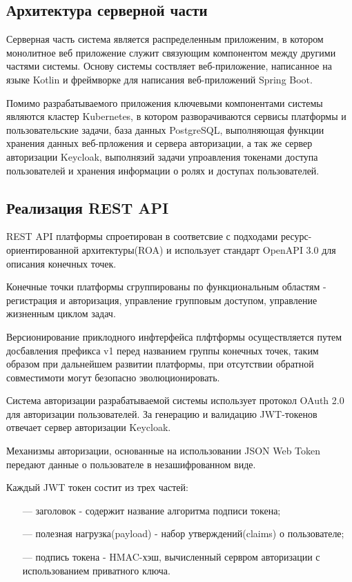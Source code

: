 \subsection{Архитектура серверной части}

Серверная часть система является распределенным приложеним, в котором монолитное веб приложение служит связующим компонентом между другими частями системы.
Основу системы соствляет веб-приложение, написанное на языке Kotlin и фреймворке для написания веб-приложений Spring Boot.

Помимо разрабатываемого приложения ключевыми компонентами системы являются кластер Kubernetes, в котором разворачиваются сервисы платформы и пользовательские задачи, база данных PostgreSQL, выполняющая функции хранения данных веб-прложения и сервера авторизации, а так же сервер авторизации Keycloak, выполнязий задачи упроавления токенами доступа пользователей и хранения информации о ролях и доступах пользователей.

\subsection{Реализация REST API}

REST API платформы спроетирован в соответсвие с подходами ресурс-ориентированной архитектуры(ROA)\cite{guinard2011internet} и использует стандарт OpenAPI 3.0 для описания конечных точек.

Конечные точки платформы сгруппированы по функциональным областям - регистрация и авторизация, управление групповым доступом, управление жизненным циклом задач.

Версионирование приклодного инфтерфейса плфтформы осуществляется путем досбавления префикса v1 перед названием группы конечных точек, таким образом при дальнейшем развитии платформы, при отсутствии обратной совместимоти могут безопасно эволюционировать.

Система авторизации разрабатываемой системы использует протокол OAuth 2.0\cite{boyd2012getting} для авторизации пользователей.
За генерацию и валидацию JWT-токенов\cite{ahmed2019authentication} отвечает сервер авторизации Keycloak.

Механизмы авторизации, основанные на использовании JSON Web Token передают данные о пользователе в незашифрованном виде.

Каждый JWT токен состит из трех частей:

\begin{itemize}
  \item[---] заголовок - содержит название алгоритма подписи токена;
  \item[---] полезная нагрузка(payload) - набор утверждений(claims) о пользователе;
  \item[---] подпись токена - HMAC-хэш, вычисленный сервром авторизации с использованием приватного ключа.
\end{itemize}


